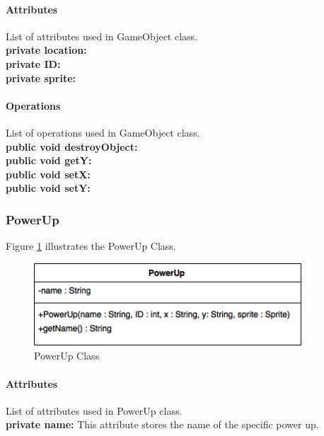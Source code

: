 \documentclass[12pt]{article} %
\begin{document}
\paragraph{Attributes\\}

List of attributes used in GameObject class.\\
\textbf{private location:} \\
\textbf{private ID:} \\
\textbf{private sprite:} \\

\paragraph{Operations \\}
List of operations used in GameObject class.\\
\textbf{public void destroyObject:}  \\
\textbf{public void getY:}  \\
\textbf{public void setX:}  \\
\textbf{public void setY:}  



\subsubsection{PowerUp} 

Figure \ref{fig:powerup} illustrates the PowerUp Class.
\begin{figure}[h!]
   \centering
   \vspace{10pt}%
   \includegraphics[width=10cm]{powerup.png}
   \caption{PowerUp Class}
   \label{fig:powerup}
\end{figure}

\paragraph{Attributes\\}

List of attributes used in PowerUp class.\\
\textbf{private name:} This attribute stores the name of the specific power up.
\end{document}

